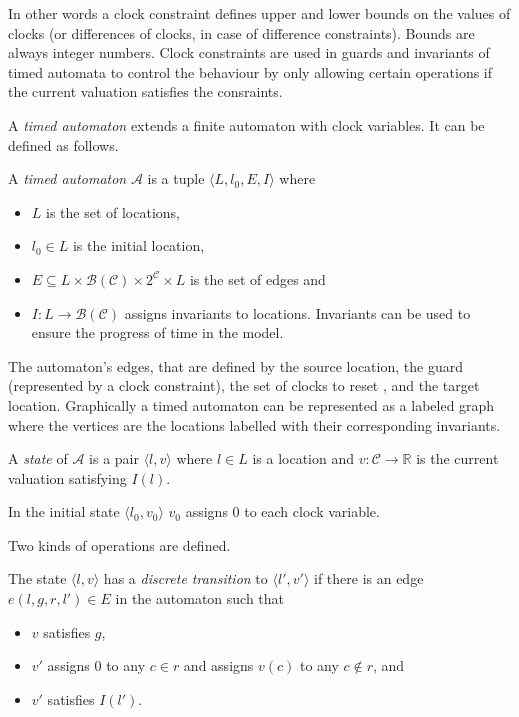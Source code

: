 In other words a clock constraint defines upper and lower bounds on the values of clocks (or differences of clocks, in case of difference constraints). Bounds are always integer numbers. Clock constraints are used in guards and invariants of timed automata to control the behaviour by only allowing certain operations if the current valuation satisfies the consraints. 

A \emph{timed automaton} extends a finite automaton with clock variables. It can be defined as follows.

\begin{dfn}
A \emph{timed automaton} $\mathcal{A}$ is a tuple $\langle L, l_0,
E, I\rangle$ where
\begin{itemize}
	\item $L$ is the set of locations,
	\item $l_0 \in L$ is the initial location,
	\item $E \subseteq L \times \mathcal{B}(\mathcal{C}) \times 2^\mathcal{C} \times L$ is the set of edges and
	\item $I: L \to \mathcal{B}(\mathcal{C})$ assigns invariants to locations.  Invariants can be used to ensure the progress of time in the model. \cite{bengtsson2004timed}
\end{itemize}
\end{dfn}

The automaton's edges, that are defined by the source location, the guard (represented by a clock constraint), the set of clocks to reset , and the target location.
Graphically a timed automaton can be represented as a labeled graph where the vertices are the locations labelled with their corresponding invariants. 


\begin{dfn}
	A \emph{state} of $\mathcal{A}$ is a pair $\langle l,v \rangle$ where $l \in L$ is a
	location and $v:\mathcal{C} \to \mathds{R}$ is the current valuation satisfying $I(l)$.
\end{dfn}
 In the initial state $\langle l_0,v_0 \rangle$ $v_0$ assigns 0 to each clock variable.

Two kinds of operations are defined.

\begin{dfn}
	 The state $\langle l,v \rangle$ has a
	 \emph{discrete transition} to $\langle l',v' \rangle$  if there is an
	 edge $e(l,g,r,l') \in E$ in the automaton such that 
	 \begin{itemize}
	 	\item $v$ satisfies $g$, 
	 	\item $v'$ assigns 0 to any $c \in r$ and assigns $v(c)$ to any $c \not\in r$, and
	 	\item $v'$ satisfies $I(l')$. 
	 \end{itemize}
\end{dfn}

